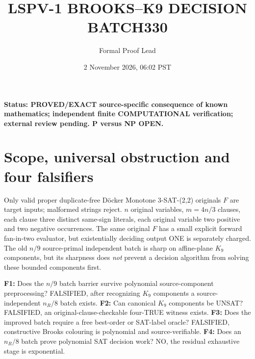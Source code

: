 \documentclass[11pt]{article}
\title{LSPV-1 BROOKS--K9 DECISION BATCH330}
\author{Formal Proof Lead}
\date{2 November 2026, 06:02 PST}
\begin{document}
\maketitle
\noindent\textbf{Status: PROVED/EXACT source-specific consequence of known mathematics; independent finite COMPUTATIONAL verification; external review pending. P versus NP OPEN.}

\section{Scope, universal obstruction and four falsifiers}
Only valid proper duplicate-free D\"ocker Monotone 3-SAT-(2,2) originals $F$ are target inputs; malformed strings reject. $n$ original variables, $m=4n/3$ clauses, each clause three distinct same-sign literals, each original variable two positive and two negative occurrences. The same original $F$ has a small explicit forward fan-in-two evaluator, but existentially deciding output ONE is separately charged. The old $n/9$ source-primal independent batch is sharp on affine-plane $K_9$ components, but its sharpness does \emph{not} prevent a decision algorithm from solving these bounded components first.

\noindent\textbf{F1:} Does the $n/9$ batch barrier survive polynomial source-component preprocessing? FALSIFIED, after recognizing $K_9$ components a source-independent $n_R/8$ batch exists. \textbf{F2:} Can canonical $K_9$ components be UNSAT? FALSIFIED, an original-clause-checkable four-TRUE witness exists. \textbf{F3:} Does the improved batch require a free best-order or SAT-label oracle? FALSIFIED, constructive Brooks colouring is polynomial and source-verifiable. \textbf{F4:} Does an $n_R/8$ batch prove polynomial SAT decision work? NO, the residual exhaustive stage is exponential.
\end{document}
